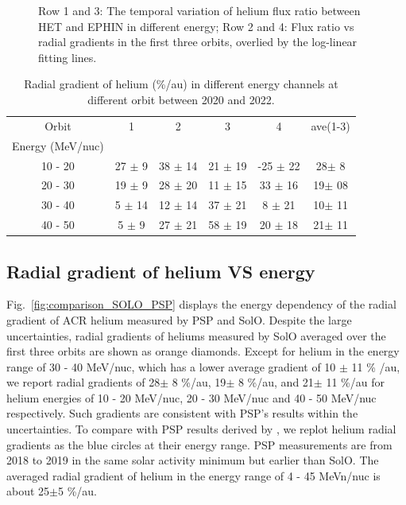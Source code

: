 \begin{figure}[!htb]
    \caption[Ratio of helium intensity between \ac{HET} and \ac{EPHIN} and helium radial grdient in different energy range]{Row 1 and 3: The temporal variation of helium flux ratio between \ac{HET} and \ac{EPHIN} in different energy; Row 2 and 4: Flux ratio vs radial gradients in the first three orbits, overlied by the log-linear fitting lines.} 
    \label{fig:ratio_radialgradient}
\end{figure}


\begin{table}[!htb]
    \centering
    \begin{tabular}{|c|c|c|c|c|c|}
        \hline
    Orbit   & 1                 & 2              & 3               & 4  & ave(1-3)\\
    Energy (MeV/nuc)  &         &                &                 &    &\\  
    \hline
    10 - 20 &  27 $\pm$ 9 & 38 $\pm$ 14 & 21 $\pm$ 19 & -25 $\pm$ 22 & 28$\pm$ 8\\
    \hline
    20 - 30 &  19 $\pm$ 9 & 28 $\pm$ 20 & 11 $\pm$ 15 & 33 $\pm$ 16 & 19$\pm$ 08\\
    \hline
    30 - 40 &  5 $\pm$ 14 & 12 $\pm$ 14 & 37 $\pm$ 21 & 8 $\pm$ 21 & 10$\pm$ 11\\
    \hline
    40 - 50 &  5 $\pm$ 9 & 27 $\pm$ 21 & 58 $\pm$ 19 & 20 $\pm$ 18 & 21$\pm$ 11\\
    \hline
    \end{tabular}
    \caption[Table of helium radial gradient]{Radial gradient of helium (\%/au) in different energy channels at different orbit between 2020 and 2022.}
    \label{Tab:radialgradient_1}
\end{table}
\subsection*{Radial gradient of helium VS energy}


Fig.~\ref{fig:comparison_SOLO_PSP} displays the energy dependency of the radial gradient of \ac{ACR} helium measured by \ac{PSP} and \ac{SolO}. 
Despite the large uncertainties, radial gradients of heliums measured by \ac{SolO} averaged over the first three orbits are shown as orange diamonds. Except for helium in the energy range of 30 - 40 MeV/nuc, which has a lower average gradient of 10 $\pm$ 11 \% /au, we report radial gradients of 28$\pm$ 8 \%/au, 19$\pm$ 8 \%/au, and 21$\pm$ 11 \%/au for helium energies of 10 - 20 MeV/nuc, 20 - 30 MeV/nuc and 40 - 50 MeV/nuc respectively.
Such gradients are consistent with \ac{PSP}'s results within the uncertainties.
To compare with \ac{PSP} results derived by \citet{Rankin2021ApJ}, we replot helium radial gradients as the blue circles at their energy range. \ac{PSP} measurements are from 2018 to 2019 in the same solar activity minimum but earlier than \ac{SolO}. The averaged radial gradient of helium in the energy range of 4 - 45 MeVn/nuc is about 25$\pm$5 \%/au. 



